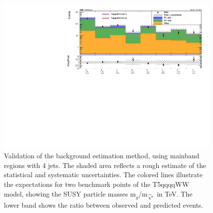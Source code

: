 \begin{figure}[!h]
\begin{center}
    \includegraphics[width=0.9 \textwidth]{Plots/analysis/results/Prediction_Spring16_templates_validation_4j_Moriond2017_lep_data_36p5_blind.pdf}
    \caption[The results of background estimation method validation.]{Validation of the background estimation method, using mainband regions with 4 jets.
    The shaded area reflects a rough estimate of the statistical and systematic uncertainties.
    The colored lines illustrate the expectations for two benchmark points of the T5qqqqWW model, showing the SUSY particle masses m$_{\tilde{g}}$/m$_{\widetilde{\chi}^0}$ in TeV.
    The lower band shows the ratio between observed and predicted events.
    }
    \label{fig:validation_0b}
\end{center}
\end{figure}
